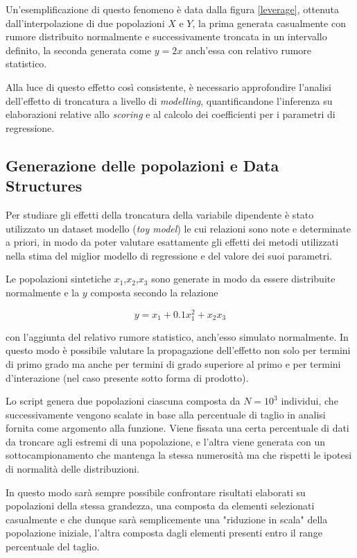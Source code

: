 \documentclass[12pt,openright,twoside,a4paper]{book}
\begin{document}
Un'esemplificazione di questo fenomeno è data dalla figura \ref{leverage}, ottenuta dall'interpolazione di due popolazioni $X$ e $Y$, la prima generata casualmente con rumore distribuito normalmente e successivamente troncata in un intervallo definito, la seconda generata come $y=2x$ anch'essa con relativo rumore statistico.

Alla luce di questo effetto così consistente, è necessario approfondire l'analisi dell'effetto di troncatura a livello di \textit{modelling}, quantificandone l'inferenza su elaborazioni relative allo \textit{scoring} e al calcolo dei coefficienti per i parametri di regressione.

\subsection{Generazione delle popolazioni e Data Structures}

Per studiare gli effetti della troncatura della variabile dipendente è stato utilizzato un dataset modello (\textit{toy model}) le cui relazioni sono note e determinate a priori, in modo da poter valutare esattamente gli effetti dei metodi utilizzati nella stima del miglior modello di regressione e del valore dei suoi parametri.

Le popolazioni sintetiche $x_1$,$x_2$,$x_3$ sono generate in modo da essere distribuite normalmente e la $y$ composta secondo la relazione

\begin{equation}
y=x_1+0.1x_1^2+x_2x_3
\label{population}
\end{equation}

con l'aggiunta del relativo rumore statistico, anch'esso simulato normalmente.
In questo modo è possibile valutare la propagazione dell'effetto non solo per termini di primo grado ma anche per  termini di grado superiore al primo e per termini d'interazione (nel caso presente sotto forma di prodotto).

Lo script genera due popolazioni ciascuna composta da $N=10^3$ individui, che successivamente vengono scalate in base alla percentuale di taglio in analisi fornita come argomento alla funzione. Viene fissata una certa percentuale di dati da troncare agli estremi di una popolazione, e l'altra viene generata con un sottocampionamento che mantenga la stessa numerosità ma che rispetti le ipotesi di normalità delle distribuzioni.

In questo modo sarà sempre possibile confrontare risultati elaborati su popolazioni della stessa grandezza, una composta da elementi selezionati casualmente e che dunque sarà semplicemente una "riduzione in scala" della popolazione iniziale, l'altra composta dagli elementi presenti entro il range percentuale del taglio.
\end{document}
